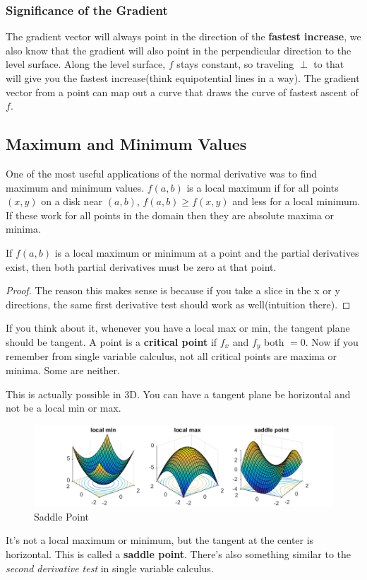 \documentclass{article}
\begin{document}
\subsubsection{Significance of the Gradient}
The gradient vector will always point in the direction of the \textbf{fastest increase}, we also know that the gradient will also point in the perpendicular direction to the level surface. Along the level surface, $f$ stays constant, so traveling $\perp$ to that will give you the fastest increase(think equipotential lines in a way). The gradient vector from a point can map out a curve that draws the curve of fastest ascent of $f$.
\subsection{Maximum and Minimum Values}
One of the most useful applications of the normal derivative was to find maximum and minimum values. $f(a,b)$ is a local maximum if for all points $(x,y)$ on a disk near $(a,b)$, $f(a,b) \geq f(x,y)$ and less for a local minimum. If these work for all points in the domain then they are absolute maxima or minima.

If $f(a,b)$ is a local maximum or minimum at a point and the partial derivatives exist, then both partial derivatives must be zero at that point.
\begin{proof}
The reason this makes sense is because if you take a slice in the x or y directions, the same first derivative test should work as well(intuition there).
\end{proof}
If you think about it, whenever you have a local max or min, the tangent plane should be tangent. A point is a \textbf{critical point} if $f_x$ and $f_y$ both $= 0$. Now if you remember from single variable calculus, not all critical points are maxima or minima. Some are neither.

This is actually possible in 3D. You can have a tangent plane be horizontal and not be a local min or max.
\begin{figure}[H]
\begin{center}
\includegraphics[scale=0.7]{saddlePoint.png}
\caption{Saddle Point}
\label{saddle}
\end{center}
\end{figure}
It's not a local maximum or minimum, but the tangent at the center is horizontal. This is called a \textbf{saddle point}. There's also something similar to the \textit{second derivative test} in single variable calculus.
\end{document}
